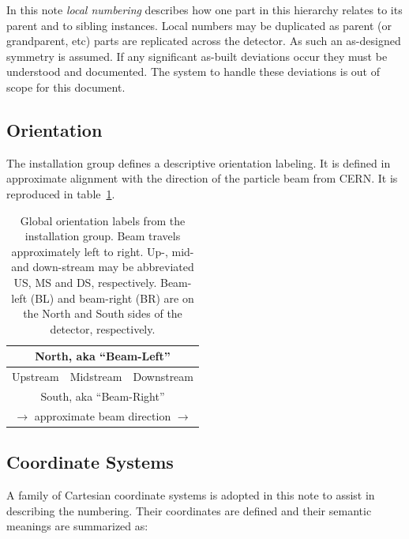 \documentclass[pdftex,12pt,letter]{article}
\begin{document}
In this note \textit{local
  numbering} describes how one part in this hierarchy relates to its
parent and to sibling instances.  Local numbers may be duplicated as
parent (or grandparent, etc) parts are replicated across the detector.
As such an as-designed symmetry is assumed.  If any significant
as-built deviations occur they must be understood and documented.  The
system to handle these deviations is out of scope for this document.  

\subsection{Orientation}

The installation group defines a descriptive orientation labeling.  It
is defined in approximate alignment with the direction of the particle
beam from CERN.  It is reproduced in table~\ref{tab:global}.

\begin{table}[htp]
  \label{tab:global}
  \centering
  \begin{tabular}[h]{|c|c|c|}
    \hline
    \multicolumn{3}{|c|}{North, aka ``Beam-Left''} \\
    \hline
    Upstream & Midstream & Downstream \\
    \hline
    \multicolumn{3}{|c|}{South, aka ``Beam-Right''} \\
    \hline
    \multicolumn{3}{c}{$\longrightarrow$ approximate beam direction $\longrightarrow$} \\    
  \end{tabular}
  \caption{Global orientation labels from the installation group.
    Beam travels approximately left to right.  Up-, mid- and
    down-stream may be abbreviated US, MS and DS, respectively.
    Beam-left (BL) and beam-right (BR) are on the North and South
    sides of the detector, respectively.}
\end{table}


\subsection{Coordinate Systems}
\label{sec:coordsys}

A family of Cartesian coordinate systems is adopted in this note to
assist in describing the numbering.  Their coordinates are defined and
their semantic meanings are summarized as:
\end{document}
